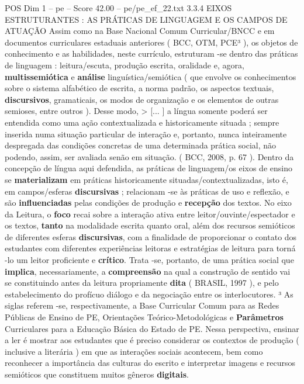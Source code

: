 \begin{textsample}{POS Dim 1 – pe – Score 42.00 – pe/pe\_ef\_22.txt}  \label{ex:f1_pos_244}
3.3.4 EIXOS ESTRUTURANTES : AS PRÁTICAS DE LINGUAGEM E OS CAMPOS DE ATUAÇÃO Assim como na Base Nacional Comum Curricular/BNCC e em documentos curriculares estaduais anteriores ( BCC, OTM, PCE³ ), os objetos de conhecimento e as habilidades, neste currículo, estruturam -se dentro das práticas de linguagem : leitura/escuta, produção escrita, oralidade e, agora, \textbf{multissemiótica} e \textbf{análise} linguística/semiótica ( que envolve os conhecimentos sobre o sistema alfabético de escrita, a norma padrão, os aspectos textuais, \textbf{discursivos}, gramaticais, os modos de organização e os elementos de outras semioses, entre outros ).
Desse modo, > [... ] a língua somente poderá ser entendida como uma ação contextualizada e historicamente situada ; sempre inserida numa situação particular de interação e, portanto, nunca inteiramente despregada das condições concretas de uma determinada prática social, não podendo, assim, ser avaliada senão em situação. ( BCC, 2008, p. 67 ).
Dentro da concepção de língua aqui defendida, as práticas de linguagem/os eixos de ensino se \textbf{materializam} em práticas historicamente situadas/contextualizadas, isto é, em campos/esferas \textbf{discursivas} ; relacionam -se às práticas de uso e reflexão, e são \textbf{influenciadas} pelas condições de produção e \textbf{recepção} dos textos.
No eixo da Leitura, o \textbf{foco} recai sobre a interação ativa entre leitor/ouvinte/espectador e os textos, \textbf{tanto} na modalidade escrita quanto oral, além dos recursos semióticos de diferentes esferas \textbf{discursivas}, com a finalidade de proporcionar o contato dos estudantes com diferentes experiências leitoras e estratégias de leitura para torná -lo um leitor proficiente e \textbf{crítico}.
Trata -se, portanto, de uma prática social que \textbf{implica}, necessariamente, a \textbf{compreensão} na qual a construção de sentido vai se constituindo antes da leitura propriamente \textbf{dita} ( BRASIL, 1997 ), e pelo estabelecimento do profícuo diálogo e da negociação entre os interlocutores. ³ As siglas referem -se, respectivamente, a Base Curricular Comum para as Redes Públicas de Ensino de PE, Orientações Teórico-Metodológicas e \textbf{Parâmetros} Curriculares para a Educação Básica do Estado de PE.
Nessa perspectiva, ensinar a ler é mostrar aos estudantes que é preciso considerar os contextos de produção ( inclusive a literária ) em que as interações sociais acontecem, bem como reconhecer a importância das culturas do escrito e interpretar imagens e recursos semióticos que constituem muitos gêneros \textbf{digitais}.

\end{textsample}
